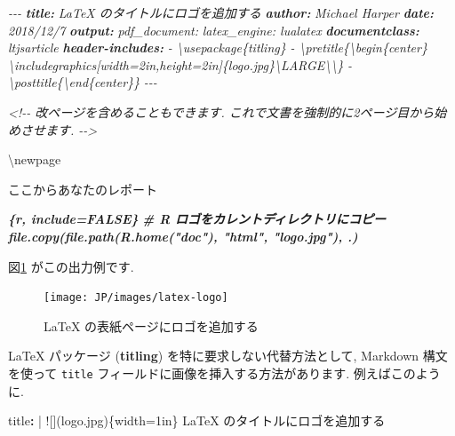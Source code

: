 \documentclass[
  11pt,
  lualatex,ja=standard,jafont=noto]{bxjsreport}
\newenvironment{Shaded}{\begin{snugshade}}{\end{snugshade}}
\newcommand{\AnnotationTok}[1]{\textcolor[rgb]{0.56,0.35,0.01}{\textbf{\textit{#1}}}}
\newcommand{\CharTok}[1]{\textcolor[rgb]{0.31,0.60,0.02}{#1}}
\newcommand{\CommentTok}[1]{\textcolor[rgb]{0.56,0.35,0.01}{\textit{#1}}}
\newcommand{\FunctionTok}[1]{\textcolor[rgb]{0.00,0.00,0.00}{#1}}
\newcommand{\InformationTok}[1]{\textcolor[rgb]{0.56,0.35,0.01}{\textbf{\textit{#1}}}}
\newcommand{\KeywordTok}[1]{\textcolor[rgb]{0.13,0.29,0.53}{\textbf{#1}}}
\newcommand{\NormalTok}[1]{#1}
\begin{document}
\begin{Shaded}
\begin{Highlighting}[]
\CommentTok{{-}{-}{-}}
\AnnotationTok{title:}\CommentTok{ LaTeX のタイトルにロゴを追加する}
\AnnotationTok{author:}\CommentTok{ Michael Harper}
\AnnotationTok{date:}\CommentTok{ 2018/12/7}
\AnnotationTok{output:}
\CommentTok{  pdf\_document:}
\CommentTok{    latex\_engine: lualatex}
\AnnotationTok{documentclass:}\CommentTok{ ltjsarticle}
\AnnotationTok{header{-}includes:}
\CommentTok{  {-} \textbackslash{}usepackage\{titling\}}
\CommentTok{  {-} \textbackslash{}pretitle\{\textbackslash{}begin\{center\}}
\CommentTok{    \textbackslash{}includegraphics[width=2in,height=2in]\{logo.jpg\}\textbackslash{}LARGE\textbackslash{}\textbackslash{}\}}
\CommentTok{  {-} \textbackslash{}posttitle\{\textbackslash{}end\{center\}\}}
\CommentTok{{-}{-}{-}}

\CommentTok{\textless{}!{-}{-} 改ページを含めることもできます. これで文書を強制的に2ページ目から始めさせます. {-}{-}\textgreater{}}

\NormalTok{\textbackslash{}newpage}

\NormalTok{ここからあなたのレポート}

\InformationTok{\textasciigrave{}\textasciigrave{}\textasciigrave{}\{r, include=FALSE\}}
\InformationTok{\# R ロゴをカレントディレクトリにコピー}
\InformationTok{file.copy(file.path(R.home("doc"), "html", "logo.jpg"), \textquotesingle{}.\textquotesingle{})}
\InformationTok{\textasciigrave{}\textasciigrave{}\textasciigrave{}}
\end{Highlighting}
\end{Shaded}

図\ref{fig:latex-logo} がこの出力例です.

\begin{figure}

{\centering \texttt{[image: JP/images/latex-logo]} 

}

\caption{LaTeX の表紙ページにロゴを追加する}\label{fig:latex-logo}
\end{figure}

LaTeX パッケージ (\textbf{titling}) を特に要求しない代替方法として, Markdown 構文を使って \texttt{title} フィールドに画像を挿入する方法があります. 例えばこのように.

\begin{Shaded}
\begin{Highlighting}[]
\FunctionTok{title}\KeywordTok{: }\CharTok{|}
\NormalTok{  ![](logo.jpg)\{width=1in\}  }
\NormalTok{  LaTeX のタイトルにロゴを追加する}
\end{Highlighting}
\end{Shaded}
\end{document}
